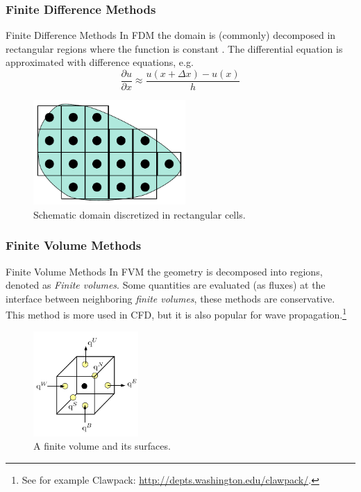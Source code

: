 \documentclass{beamer}
\newcommand{\pardiff}[2]{\frac{\partial #1}{\partial #2}}
\begin{document}
\subsubsection{Finite Difference Methods}
\begin{frame}{Finite Difference Methods}
In FDM the domain is (commonly) decomposed in rectangular regions where the function is constant \cite{wiki:FDM}. The differential equation is approximated with difference equations, e.g.
\[\pardiff{u}{x} \approx \frac{u(x + \Delta x) - u(x)}{h}\]
\begin{figure}
\includegraphics[height=4cm]{img/FDM.pdf} 
\caption{Schematic domain discretized in rectangular cells.}
\end{figure}
\end{frame}

\subsubsection{Finite Volume Methods}
\begin{frame}{Finite Volume Methods}
In FVM the geometry is decomposed into regions, denoted as \emph{Finite volumes}. Some quantities are evaluated (as fluxes) at the interface between neighboring \emph{finite volumes}, these methods are conservative. This method is more used in CFD, but it is also popular for wave propagation.\footnote{See for example Clawpack: \url{http://depts.washington.edu/clawpack/}.}
\begin{figure}
\includegraphics[height=4cm]{img/FVM.pdf} 
\caption{A finite volume and its surfaces.}
\end{figure}

\end{frame}
\end{document}
